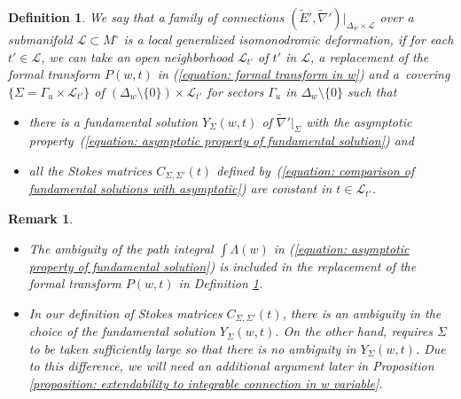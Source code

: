 \documentclass[pdftex]{sigma}
\numberwithin{equation}{section}
\newtheorem{Definition}[Theorem]{Definition}
\newtheorem{Remark}[Theorem]{Remark}
\begin{document}
\begin{Definition} \label{definition: local generalized isomonodromic deformation}
We say that a family of connections
$(\tilde{E}',\tilde{\nabla}')|_{\Delta_w\times {\mathcal L}}$
over a submanifold ${\mathcal L}\subset M^{\circ}$
is a local generalized isomonodromic deformation,
if for each $t'\in{\mathcal L}$,
we can take an open neighborhood ${\mathcal L}_{t'}$ of $t'$ in ${\mathcal L}$,
a replacement of the formal transform $P(w,t)$ in (\ref{equation: formal transform in w})
and a~covering $\{\Sigma=\Gamma_u\times {\mathcal L}_{t'}\}$
of $(\Delta_w\setminus\{0\})\times {\mathcal L}_{t'}$ for sectors
$\Gamma_u$ in $\Delta_w\setminus\{0\}$
such that
\begin{itemize}\itemsep=0pt
\item[(i)]
there is a fundamental solution
$Y_{\Sigma}(w,t)$ of $\tilde{\nabla}'|_{\Sigma}$
with the asymptotic property~(\ref{equation: asymptotic property of fundamental solution})
and
\item[(ii)]
all the Stokes matrices $C_{\Sigma,\Sigma'}(t)$
defined by~(\ref{equation: comparison of fundamental solutions with asymptotic})
are constant in $t\in {\mathcal L}_{t'}$.
\end{itemize}
\end{Definition}

\begin{Remark}\quad
\begin{itemize}\itemsep=0pt
\item[(1)]
 The ambiguity of the path integral $\int\Lambda(w)$
 in (\ref{equation: asymptotic property of fundamental solution})
 is included in the replacement of the formal transform $P(w,t)$ in
 Definition \ref{definition: local generalized isomonodromic deformation}.
\item[(2)]
In our definition of Stokes matrices $C_{\Sigma,\Sigma'}(t)$,
there is an ambiguity in the choice of the fundamental solution $Y_{\Sigma}(w,t)$.
On the other hand, \cite[Proposition 2.4]{Jimbo-Miwa-Ueno}
requires $\Sigma$ to be taken sufficiently large so that
there is no ambiguity in $Y_{\Sigma}(w,t)$.
Due to this difference, we will need an additional argument later
in Proposition \ref{proposition: extendability to integrable connection in w variable}.
\end{itemize}
\end{Remark}
\end{document}
